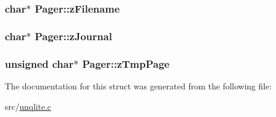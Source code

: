 \hypertarget{struct_pager_a2a55a044468f8658b7993e57087a5561}{
\subsubsection[{z\-Filename}]{\setlength{\rightskip}{0pt plus 5cm}char$\ast$ Pager\-::z\-Filename}}\label{d0/dba/struct_pager_a2a55a044468f8658b7993e57087a5561}
\hypertarget{struct_pager_ab36ce1f606c407ad3fc56a3651f5a319}{
\subsubsection[{z\-Journal}]{\setlength{\rightskip}{0pt plus 5cm}char$\ast$ Pager\-::z\-Journal}}\label{d0/dba/struct_pager_ab36ce1f606c407ad3fc56a3651f5a319}
\hypertarget{struct_pager_a77f5ef394dfa4ff278fe9d92ac99aad1}{
\subsubsection[{z\-Tmp\-Page}]{\setlength{\rightskip}{0pt plus 5cm}unsigned char$\ast$ Pager\-::z\-Tmp\-Page}}\label{d0/dba/struct_pager_a77f5ef394dfa4ff278fe9d92ac99aad1}


The documentation for this struct was generated from the following file\-:\begin{DoxyCompactItemize}
\item 
src/\hyperlink{unqlite_8c}{unqlite.\-c}\end{DoxyCompactItemize}
